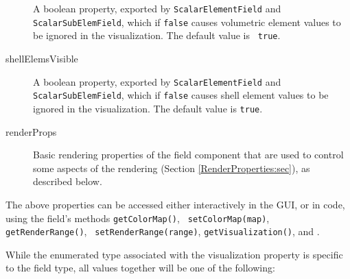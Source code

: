 \begin{description}
A boolean property, exported by {\tt ScalarElementField} and {\tt
ScalarSubElemField}, which if {\tt false} causes volumetric element
values to be ignored in the visualization. The default value is {\tt
true}.

\item[shellElemsVisible]\mbox{}

A boolean property, exported by {\tt ScalarElementField} and {\tt
ScalarSubElemField}, which if {\tt false} causes shell element values
to be ignored in the visualization. The default value is {\tt true}.

\item[renderProps]\mbox{}

Basic rendering properties of the field component that are used to
control some aspects of the rendering
(Section \ref{RenderProperties:sec}), as described below.

\end{description}

The above properties can be accessed either interactively in the GUI,
or in code, using the field's methods {\tt getColorMap()}, {\tt
setColorMap(map)}, {\tt getRenderRange()}, {\tt
setRenderRange(range)}, {\tt getVisualization()}, and .

While the enumerated type associated with the {\sf visualization}
property is specific to the field type, all values together will be
one of the following:

